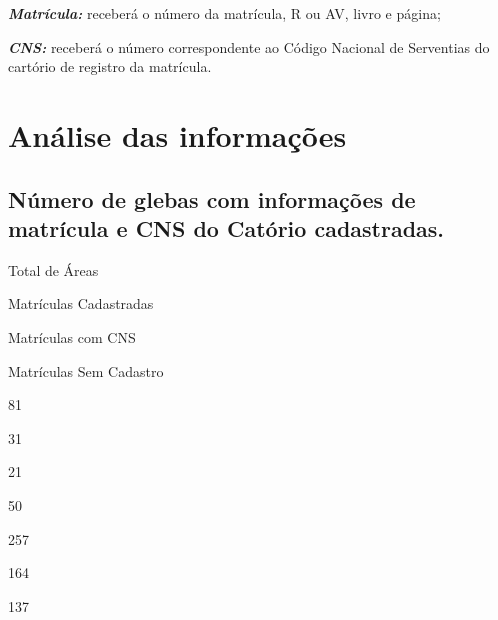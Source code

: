\documentclass[
  letterpaper,
]{report}
\begin{document}
\emph{\textbf{Matrícula:}} receberá o número da matrícula, R ou AV,
livro e página;

\emph{\textbf{CNS:}} receberá o número correspondente ao Código Nacional
de Serventias do cartório de registro da matrícula.

\hypertarget{anuxe1lise-das-informauxe7uxf5es}{%
\section{Análise das
informações}\label{anuxe1lise-das-informauxe7uxf5es}}

\hypertarget{nuxfamero-de-glebas-com-informauxe7uxf5es-de-matruxedcula-e-cns-do-catuxf3rio-cadastradas.}{%
\subsection{Número de glebas com informações de matrícula e CNS do
Catório
cadastradas.}\label{nuxfamero-de-glebas-com-informauxe7uxf5es-de-matruxedcula-e-cns-do-catuxf3rio-cadastradas.}}

\n  

\n    

\n      

Total de Áreas

\n      

Matrículas Cadastradas

\n      

Matrículas com CNS

\n      

Matrículas Sem Cadastro

\n    

\n  

\n  

\n    

\n      

81

\n      

31

\n      

21

\n      

50

\n    

\n    

\n      

257

\n      

164

\n      

137

\n      
\end{document}
